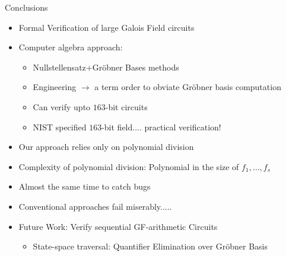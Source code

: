 \documentclass[xcolor=dvipsnames]{beamer}
\begin{document}
\begin{frame}{\large{Conclusions}}


\begin{itemize}
\item Formal Verification of large Galois Field circuits
\item Computer algebra approach:
\begin{itemize}
	\item  Nullstellensatz+Gr\"obner Bases methods
	\item Engineering $\rightarrow$ a term order to obviate
          Gr\"obner basis computation
	\item Can verify upto $163$-bit circuits
          \item NIST specified $163$-bit field.... practical verification!
\end{itemize}
\item Our approach relies only on polynomial division
\item Complexity of polynomial division: Polynomial in the size of
  $f_1, \dots, f_s$
\item Almost the same time to catch bugs
\item Conventional approaches fail miserably.....
\item Future Work: Verify sequential GF-arithmetic Circuits
\begin{itemize}
\item State-space traversal: Quantifier Elimination over Gr\"obner Basis
\end{itemize}
\end{itemize}

\end{frame}

\end{document}
